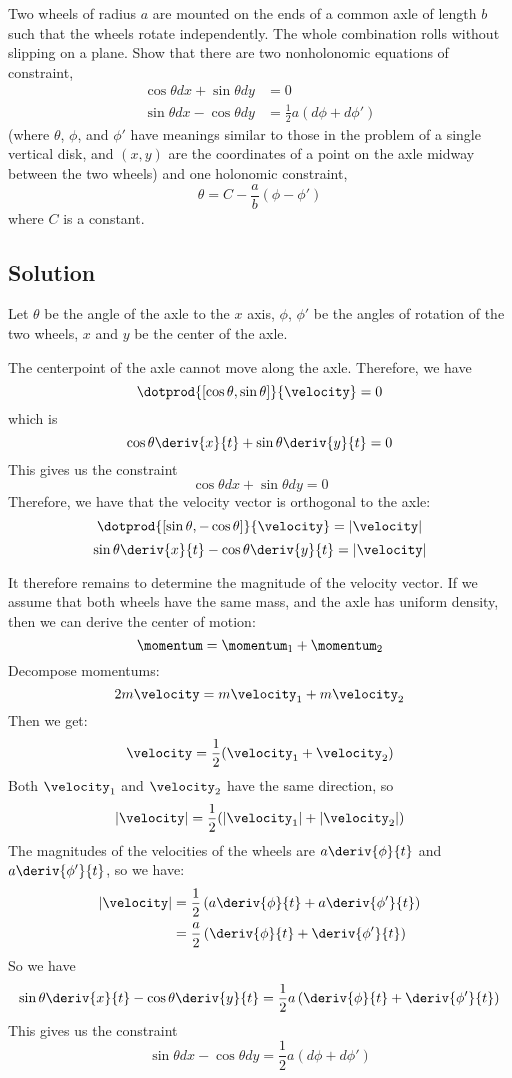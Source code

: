 Two wheels of radius $a$ are mounted on the ends of a common axle of
length $b$ such that the wheels rotate independently.  The whole
combination rolls without slipping on a plane.  Show that there are
two nonholonomic equations of constraint,
\begin{align*}
\cos\theta dx + \sin\theta dy &= 0 \\
\sin\theta dx - \cos\theta dy &= \frac{1}{2}a(d\phi + d\phi')
\end{align*}
(where $\theta$, $\phi$, and $\phi'$ have meanings similar to those in
the problem of a single vertical disk, and $(x, y)$ are the
coordinates of a point on the axle midway between the two wheels) and
one holonomic constraint,
\[\theta = C - \frac{a}{b}(\phi - \phi')\]
where $C$ is a constant.

\subsection*{Solution}

Let $\theta$ be the angle of the axle to the $x$ axis, $\phi$, $\phi'$
be the angles of rotation of the two wheels, $x$ and $y$ be the center
of the axle.

The centerpoint of the axle cannot move along the axle.  Therefore, we
have
\[\dotprod{[\cos\theta, \sin\theta]}{\velocity} = 0\]
which is
\[\cos\theta\deriv{x}{t} + \sin\theta\deriv{y}{t} = 0\]
This gives us the constraint
\[\cos\theta dx + \sin\theta dy = 0\]
Therefore, we have that the velocity vector is orthogonal to the axle:
\[\dotprod{[\sin\theta, -\cos\theta]}{\velocity} = |\velocity|\]
\[\sin\theta\deriv{x}{t} - \cos\theta\deriv{y}{t} = |\velocity|\]

It therefore remains to determine the magnitude of the velocity
vector.  If we assume that both wheels have the same mass, and the
axle has uniform density, then we can derive the center of motion:
\[\momentum = \momentum_1 + \momentum_2\]
Decompose momentums:
\[2m\velocity = m\velocity_1 + m\velocity_2\]
Then we get:
\[\velocity = \frac{1}{2}(\velocity_1 + \velocity_2)\]
Both $\velocity_1$ and $\velocity_2$ have the same direction, so
\[|\velocity| = \frac{1}{2}(|\velocity_1| + |\velocity_2|)\]
The magnitudes of the velocities of the wheels are $a\deriv{\phi}{t}$
and $a\deriv{\phi'}{t}$, so we have:
\begin{align*}
  |\velocity|
  &=
  \frac{1}{2}\left(a\deriv{\phi}{t} + a\deriv{\phi'}{t}\right) \\
  &=
  \frac{a}{2}\left(\deriv{\phi}{t} + \deriv{\phi'}{t}\right)
\end{align*}
So we have
\[\sin\theta\deriv{x}{t} - \cos\theta\deriv{y}{t} =
\frac{1}{2}a\left(\deriv{\phi}{t} + \deriv{\phi'}{t}\right)\]
This gives us the constraint
\[\sin\theta dx - \cos\theta dy = \frac{1}{2}a(d\phi + d\phi')\]


